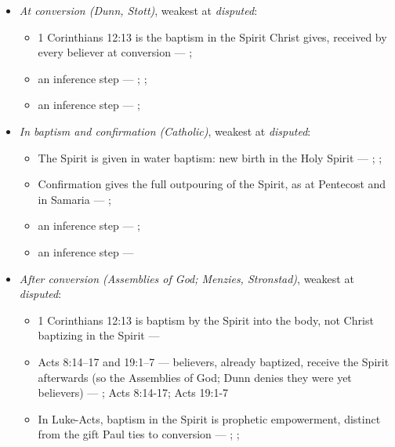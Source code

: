 \documentclass[11pt]{article}
\begin{document}
\begin{itemize}
\item \emph{At conversion (Dunn, Stott)}, weakest at \emph{disputed}:
\begin{itemize}
\item 1 Corinthians 12:13 is the baptism in the Spirit Christ gives, received by every believer at conversion --- \cite{dunn-baptism-holy-spirit-1970}; \cite{stott-baptism-fullness-1975}
\item an inference step --- \cite{dunn-baptism-holy-spirit-1970}; \cite{stott-baptism-fullness-1975}; \cite{assemblies-of-god-baptism-holy-spirit-2010}
\item an inference step --- \cite{menzies-lukes-understanding-2017}; \cite{menzies-empowered-witness-1994}
\end{itemize}
\item \emph{In baptism and confirmation (Catholic)}, weakest at \emph{disputed}:
\begin{itemize}
\item The Spirit is given in water baptism: new birth in the Holy Spirit --- \cite[1262]{catholic-church-catechism-2000}; \cite[1265]{catholic-church-catechism-2000}; \cite[Small Catechism, Baptism, third part]{kolb-wengert-book-of-concord-2000}
\item Confirmation gives the full outpouring of the Spirit, as at Pentecost and in Samaria --- \cite[1302]{catholic-church-catechism-2000}; \cite[1288]{catholic-church-catechism-2000}
\item an inference step --- \cite[1302]{catholic-church-catechism-2000}; \cite[XXVIII.6]{westminster-confession-1647}
\item an inference step --- \cite[1302]{catholic-church-catechism-2000}
\end{itemize}
\item \emph{After conversion (Assemblies of God; Menzies, Stronstad)}, weakest at \emph{disputed}:
\begin{itemize}
\item 1 Corinthians 12:13 is baptism by the Spirit into the body, not Christ baptizing in the Spirit --- \cite{assemblies-of-god-baptism-holy-spirit-2010}
\item Acts 8:14–17 and 19:1–7 — believers, already baptized, receive the Spirit afterwards (so the Assemblies of God; Dunn denies they were yet believers) --- \cite{assemblies-of-god-baptism-holy-spirit-2010}; Acts 8:14-17; Acts 19:1-7
\item In Luke-Acts, baptism in the Spirit is prophetic empowerment, distinct from the gift Paul ties to conversion --- \cite{menzies-lukes-understanding-2017}; \cite{menzies-empowered-witness-1994}; \cite{stronstad-charismatic-theology-1984}

\end{itemize}
\end{itemize}
\end{document}
